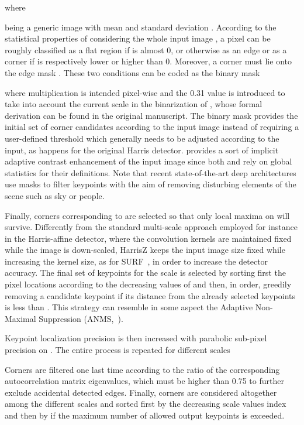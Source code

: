 \documentclass[times,twocolumn,final,authoryear]{elsarticle}
\begin{document}
where

being  a generic image with mean  and standard deviation . According to the statistical properties of  considering the whole input image , a pixel  can be roughly classified as a flat region if  is almost 0, or otherwise as an edge or as a corner if  is respectively lower or higher than 0. Moreover, a corner must lie onto the edge mask . These two conditions can be coded as the binary mask  

where multiplication is intended pixel-wise and the 0.31 value is introduced to take into account the current scale in the binarization of , whose formal derivation can be found in the original manuscript. The binary mask  provides the initial set of corner candidates according to the input image instead of requiring a user-defined threshold which generally needs to be adjusted according to the input, as happens for the original Harris detector.  provides a sort of implicit adaptive contrast enhancement of the input image since both  and  rely on global statistics for their definitions. Note that recent state-of-the-art deep architectures use masks to filter keypoints with the aim of removing disturbing elements of the scene such as sky or people\footnotemark[2].

Finally, corners corresponding to  are selected so that only local maxima on  will survive. Differently from the standard multi-scale approach employed for instance in the Harris-affine detector, where the convolution kernels are maintained fixed while the image is down-scaled, HarrisZ keeps the input image size fixed while increasing the kernel size, as for SURF~\citep{surf}, in order to increase the detector accuracy. The final set of keypoints for the scale  is selected by sorting first the  pixel locations according to the decreasing values of  and then, in order, greedily removing a candidate keypoint if its distance from the already selected keypoints is less than . This strategy can resemble in some aspect the Adaptive Non-Maximal Suppression (ANMS,~\cite{anms}). 

Keypoint localization precision is then increased with parabolic sub-pixel precision on . The entire process is repeated for different scales

Corners are filtered one last time according to the ratio of the corresponding autocorrelation matrix eigenvalues, which must be higher than 0.75 to further exclude accidental detected edges. Finally, corners are considered altogether among the different scales and sorted first by the decreasing scale values index  and then by  if the maximum number of allowed output keypoints is exceeded. 
\end{document}
